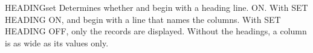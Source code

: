 \begin{XbaseEntry}{HEADING}{set}
Determines whether  and  begin with a heading line.
\Syntax
{}
\Defaults
ON.
\Usage
With SET HEADING ON,  and  begin with a line that names
the columns.  With SET HEADING OFF, only the records are displayed.  Without
the headings, a column is as wide as its values only.
\Examples
{}
\end{XbaseEntry}

